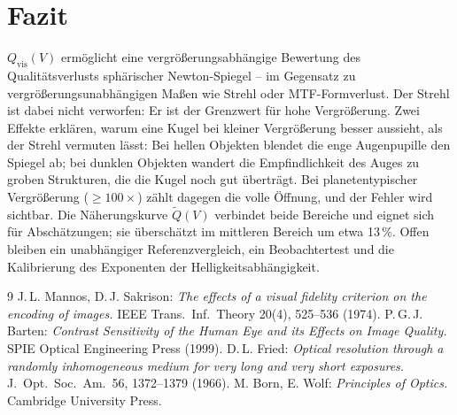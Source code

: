 \documentclass[11pt,a4paper]{article}
\newcommand{\Qvis}{Q_{\mathrm{vis}}}
\begin{document}
\section{Fazit}
$\Qvis(V)$ ermöglicht eine vergrößerungsabhängige Bewertung des Qualitätsverlusts sphärischer Newton-Spiegel -- im Gegensatz zu vergrößerungsunabhängigen Maßen wie Strehl oder MTF-Formverlust. Der Strehl ist dabei nicht verworfen: Er ist der Grenzwert für hohe Vergrößerung. Zwei Effekte erklären, warum eine Kugel bei kleiner Vergrößerung besser aussieht, als der Strehl vermuten lässt: Bei hellen Objekten blendet die enge Augenpupille den Spiegel ab; bei dunklen Objekten wandert die Empfindlichkeit des Auges zu groben Strukturen, die die Kugel noch gut überträgt. Bei planetentypischer Vergrößerung ($\ge100\times$) zählt dagegen die volle Öffnung, und der Fehler wird sichtbar. Die Näherungskurve $\tilde Q(V)$ verbindet beide Bereiche und eignet sich für Abschätzungen; sie überschätzt im mittleren Bereich um etwa 13\,\%. Offen bleiben ein unabhängiger Referenzvergleich, ein Beobachtertest und die Kalibrierung des Exponenten der Helligkeitsabhängigkeit.

\begin{thebibliography}{9}
 J.\,L. Mannos, D.\,J. Sakrison: \emph{The effects of a visual fidelity criterion on the encoding of images.} IEEE Trans.\ Inf.\ Theory 20(4), 525--536 (1974).
 P.\,G.\,J. Barten: \emph{Contrast Sensitivity of the Human Eye and its Effects on Image Quality.} SPIE Optical Engineering Press (1999).
 D.\,L. Fried: \emph{Optical resolution through a randomly inhomogeneous medium for very long and very short exposures.} J.\ Opt.\ Soc.\ Am.\ 56, 1372--1379 (1966).
 M. Born, E. Wolf: \emph{Principles of Optics.} Cambridge University Press.
\end{thebibliography}
\end{document}

